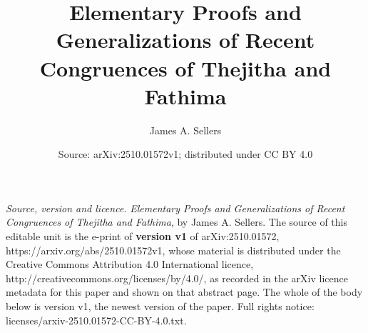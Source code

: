 \documentclass[10pt,a4paper]{amsart}
\theoremstyle{definition}
\theoremstyle{example}
\begin{document}
\title{Elementary Proofs and Generalizations of Recent Congruences of Thejitha and Fathima}
\author{James A. Sellers}
\address{Department of Mathematics and Statistics, University of Minnesota Duluth, Duluth, MN 55812, USA}
\date{Source: arXiv:2510.01572v1; distributed under CC BY 4.0}
\maketitle
\noindent\emph{Source, version and licence.} \emph{Elementary Proofs and Generalizations of Recent Congruences of Thejitha and Fathima}, by James A. Sellers. The source of this editable unit is the e-print of \textbf{version v1} of arXiv:2510.01572, https://arxiv.org/abs/2510.01572v1, whose material is distributed under the Creative Commons Attribution 4.0 International licence, http://creativecommons.org/licenses/by/4.0/, as recorded in the arXiv licence metadata for this paper and shown on that abstract page. The whole of the body below is version v1, the newest version of the paper. Full rights notice: licenses/arxiv-2510.01572-CC-BY-4.0.txt.\par\smallskip
\end{document}
